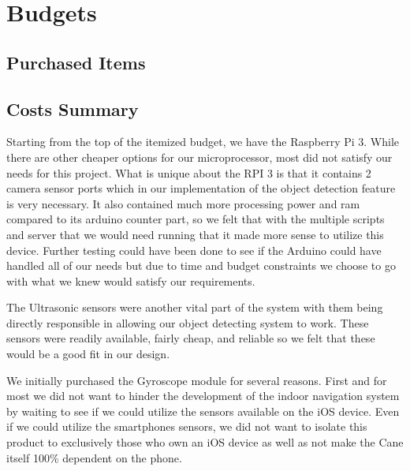 \documentclass[letterpaper,12pt]{article}
\begin{document}
\newpage


\section{Budgets}


\subsection{Purchased Items}

\subsection{Costs Summary}
    Starting from the top of the itemized budget, we have the Raspberry Pi 3. While there are other cheaper options for our microprocessor, most did not satisfy our needs for this project. What is unique about the RPI 3 is that it contains 2 camera sensor ports which in our implementation of the object detection feature is very necessary. It also contained much more processing power and ram compared to its arduino counter part, so we felt that with the multiple scripts and server that we would need running that it made more sense to utilize this device. Further testing could have been done to see if the Arduino could have handled all of our needs but due to time and budget constraints we choose to go with what we knew would satisfy our requirements. \par
    
    The Ultrasonic sensors were another vital part of the system with them being directly responsible in allowing our object detecting system to work. These sensors were readily available, fairly cheap, and reliable so we felt that these would be a good fit in our design. \par
    
    We initially purchased the Gyroscope module for several reasons. First and for most we did not want to hinder the development of the indoor navigation system by waiting to see if we could utilize the sensors available on the iOS device. Even if we could utilize the smartphones sensors, we did not want to isolate this product to exclusively those who own an iOS device as well as not make the Cane itself 100\% dependent on the phone. \par
    
\end{document}
